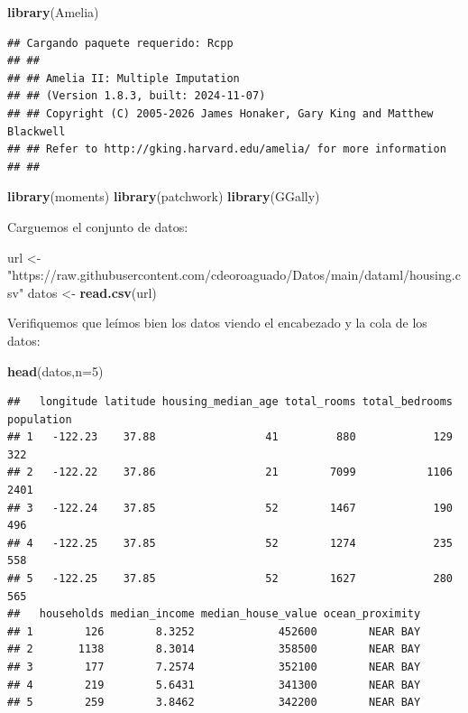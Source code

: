 \documentclass[
]{book}
\newenvironment{Shaded}{\begin{snugshade}}{\end{snugshade}}
\newcommand{\AttributeTok}[1]{\textcolor[rgb]{0.13,0.29,0.53}{#1}}
\newcommand{\DecValTok}[1]{\textcolor[rgb]{0.00,0.00,0.81}{#1}}
\newcommand{\FunctionTok}[1]{\textcolor[rgb]{0.13,0.29,0.53}{\textbf{#1}}}
\newcommand{\NormalTok}[1]{#1}
\newcommand{\OtherTok}[1]{\textcolor[rgb]{0.56,0.35,0.01}{#1}}
\newcommand{\StringTok}[1]{\textcolor[rgb]{0.31,0.60,0.02}{#1}}
\begin{document}
\begin{Shaded}
\begin{Highlighting}[]
\FunctionTok{library}\NormalTok{(Amelia)}
\end{Highlighting}
\end{Shaded}

\begin{verbatim}
## Cargando paquete requerido: Rcpp
## ## 
## ## Amelia II: Multiple Imputation
## ## (Version 1.8.3, built: 2024-11-07)
## ## Copyright (C) 2005-2026 James Honaker, Gary King and Matthew Blackwell
## ## Refer to http://gking.harvard.edu/amelia/ for more information
## ##
\end{verbatim}

\begin{Shaded}
\begin{Highlighting}[]
\FunctionTok{library}\NormalTok{(moments)}
\FunctionTok{library}\NormalTok{(patchwork)}
\FunctionTok{library}\NormalTok{(GGally)}
\end{Highlighting}
\end{Shaded}

Carguemos el conjunto de datos:

\begin{Shaded}
\begin{Highlighting}[]
\NormalTok{url }\OtherTok{\textless{}{-}} \StringTok{"https://raw.githubusercontent.com/cdeoroaguado/Datos/main/dataml/housing.csv"}
\NormalTok{datos }\OtherTok{\textless{}{-}} \FunctionTok{read.csv}\NormalTok{(url)}
\end{Highlighting}
\end{Shaded}

Verifiquemos que leímos bien los datos viendo el encabezado y la cola de los datos:

\begin{Shaded}
\begin{Highlighting}[]
\FunctionTok{head}\NormalTok{(datos,}\AttributeTok{n=}\DecValTok{5}\NormalTok{)}
\end{Highlighting}
\end{Shaded}

\begin{verbatim}
##   longitude latitude housing_median_age total_rooms total_bedrooms population
## 1   -122.23    37.88                 41         880            129        322
## 2   -122.22    37.86                 21        7099           1106       2401
## 3   -122.24    37.85                 52        1467            190        496
## 4   -122.25    37.85                 52        1274            235        558
## 5   -122.25    37.85                 52        1627            280        565
##   households median_income median_house_value ocean_proximity
## 1        126        8.3252             452600        NEAR BAY
## 2       1138        8.3014             358500        NEAR BAY
## 3        177        7.2574             352100        NEAR BAY
## 4        219        5.6431             341300        NEAR BAY
## 5        259        3.8462             342200        NEAR BAY
\end{verbatim}
\end{document}
